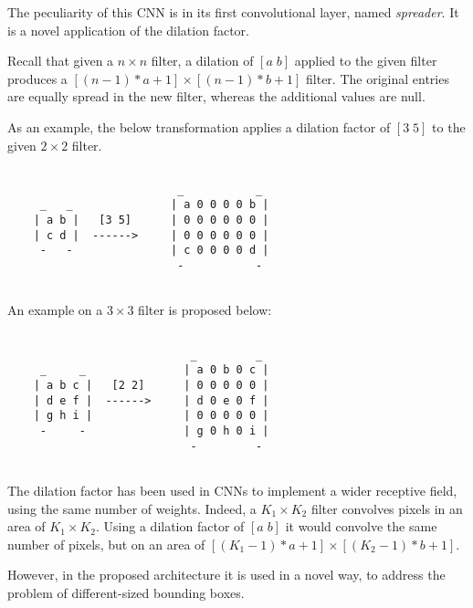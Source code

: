         \par{
            The peculiarity of this CNN is in its first convolutional layer, named \emph{spreader}. It is a novel application of the dilation factor. 
        }
        \par{
            Recall that given a $n\times n$ filter, a dilation of $[a\;b]$ applied to the given filter produces a $\left[\left(n-1\right)*a + 1\right] \times \left[\left(n-1\right)*b + 1\right]$ filter. The original entries are equally spread in the new filter, whereas the additional values are null.
        }
        \par{
            As an example, the below transformation applies a dilation factor of $\left[3\;5\right]$ to the given $2\times 2$ filter.
        }
        \begin{BVerbatim}
            
                          _           _
     _   _               | a 0 0 0 0 b |
    | a b |   [3 5]      | 0 0 0 0 0 0 |
    | c d |  ------>     | 0 0 0 0 0 0 |
     -   -               | c 0 0 0 0 d |
                          -           -
                    
        \end{BVerbatim}
        \par{
            An example on a $3\times 3$ filter is proposed below:
        } 
        \begin{BVerbatim}
            
                            _         _
     _     _               | a 0 b 0 c |
    | a b c |   [2 2]      | 0 0 0 0 0 |
    | d e f |  ------>     | d 0 e 0 f |
    | g h i |              | 0 0 0 0 0 |
     -     -               | g 0 h 0 i |
                            -         -
                    
        \end{BVerbatim}
        \par{
            The dilation factor has been used in CNNs to implement a wider receptive field, using the same number of weights. Indeed, a $K_1 \times K_2$ filter convolves pixels in an area of $K_1 \times K_2$. Using a dilation factor of $\left[a\;b\right]$ it would convolve the same number of pixels, but on an area of $\left[\left(K_1-1\right)*a + 1\right] \times \left[\left(K_2-1\right)*b + 1\right]$.
        }
        \par{
            However, in the proposed architecture it is used in a novel way, to address the problem of different-sized bounding boxes.
        }
        \par{
        
        }
